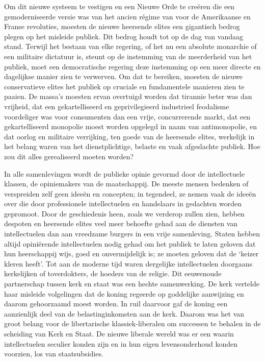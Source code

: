 \documentclass[
  a5paper,
  smalldemyvopaper,10pt,twoside,onecolumn,openright,extrafontsizes,hidelinks]{memoir}
\begin{document}
Om dit nieuwe systeem te vestigen en een Nieuwe Orde te creëren die een
gemoderniseerde versie was van het ancien régime van voor de Amerikaanse
en Franse revoluties, moesten de nieuwe heersende elites een gigantisch
bedrog plegen op het misleide publiek. Dit bedrog houdt tot op de dag
van vandaag stand. Terwijl het bestaan van elke regering, of het nu een
absolute monarchie of een militaire dictatuur is, steunt op de
instemming van de meerderheid van het publiek, moet een democratische
regering deze instemming op een meer directe en dagelijkse manier zien
te verwerven. Om dat te bereiken, moesten de nieuwe conservatieve elites
het publiek op cruciale en fundamentele manieren zien te paaien. De
massa's moesten ervan overtuigd worden dat tirannie beter was dan
vrijheid, dat een gekartelliseerd en geprivilegieerd industrieel
feodalisme voordeliger was voor consumenten dan een vrije, concurrerende
markt, dat een gekartelliseerd monopolie moest worden opgelegd in naam
van antimonopolie, en dat oorlog en militaire verrijking, ten goede van
de heersende elites, werkelijk in het belang waren van het
dienstplichtige, belaste en vaak afgeslachte publiek. Hoe zou dit alles
gerealiseerd moeten worden?

In alle samenlevingen wordt de publieke opinie gevormd door de
intellectuele klassen, de opiniemakers van de maatschappij. De meeste
mensen bedenken of verspreiden zelf geen ideeën en concepten; in
tegendeel, ze nemen vaak de ideeën over die door professionele
intellectuelen en handelaars in gedachten worden gepromoot. Door de
geschiedenis heen, zoals we verderop zullen zien, hebben despoten en
heersende elites veel meer behoefte gehad aan de diensten van
intellectuelen dan aan vreedzame burgers in een vrije samenleving.
Staten hebben altijd opiniërende intellectuelen nodig gehad om het
publiek te laten geloven dat hun heerschappij wijs, goed en
onvermijdelijk is; ze moeten geloven dat de `keizer kleren heeft'. Tot
aan de moderne tijd waren dergelijke intellectuelen doorgaans
kerkelijken of toverdokters, de hoeders van de religie. Dit eeuwenoude
partnerschap tussen kerk en staat was een hechte samenwerking. De kerk
vertelde haar misleide volgelingen dat de koning regeerde op goddelijke
aanwijzing en daarom gehoorzaamd moest worden. In ruil daarvoor gaf de
koning een aanzienlijk deel van de belastinginkomsten aan de kerk.
Daarom was het van groot belang voor de libertarische klassiek-liberalen
om successen te behalen in de scheiding van Kerk en Staat. De nieuwe
liberale wereld was er een waarin intellectuelen seculier konden zijn en
in hun eigen levensonderhoud konden voorzien, los van staatsubsidies.
\end{document}
